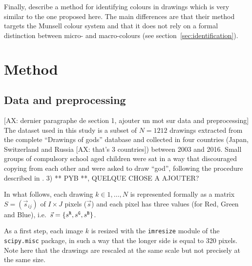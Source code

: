 \documentclass[11pt,a4paper]{article}
\begin{document}
Finally, \citet{kimbaelee2007} describe a method for identifying colours in drawings which is very similar to the one proposed here. The main differences are that their method targets the Munsell colour system \cite{Munsell1912} and that it does not rely on a formal distinction between micro- and macro-colours (see section~\ref{sec:identification}).



\section{Method}\label{methods}
\label{sec:method}


\subsection{Data and preprocessing}
\label{sec:dataset_preprocessing}

{\color{red} [AX: dernier paragraphe de section 1, ajouter un mot sur data and preprocessing]}
The dataset used in this study is a subset of $N = 1212$ drawings extracted from the complete ``Drawings of gods'' database and collected in four countries (Japan, Switzerland and Russia {\color{red} [AX: that's 3 countries]}) between 2003 and 2016. Small groups of compulsory school aged children were sat in a way that discouraged copying from each other and were asked to draw ``god'', following the procedure described in \citet{DandarovaRobertDessartSerbaevaEtAl2016}.
{\color{red} 3) ** PYB **, QUELQUE CHOSE A AJOUTER?}

In what follows, each drawing $k \in 1,\dots, N$ is represented formally as a matrix $S = (\vec{s}_{ij})$ of $I \times J$ pixels ($\vec{s}$) and each pixel has three values (for Red, Green and Blue), i.e.~$\vec{s} = \{ s^{\tt \scriptstyle R}, s^{\tt \scriptstyle G}, s^{\tt \scriptstyle B} \}$.

As a first step, each image $k$ is resized with the {\tt imresize}
module of the {\tt scipy.misc} package, in such a way that the longer side is
equal to 320 pixels. Note here that the drawings are
rescaled at the same scale but not precisely at the same size.
\end{document}
